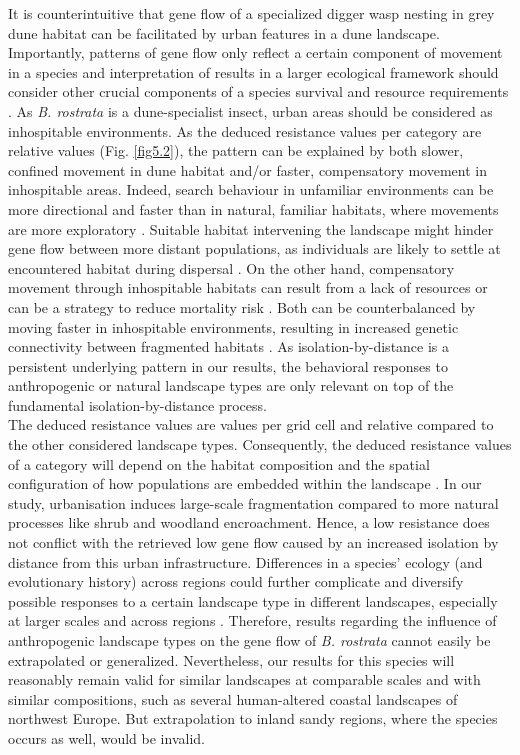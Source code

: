 \documentclass[10pt, twoside]{book} %
\begin{document}
	It is counterintuitive that gene flow of a specialized digger wasp nesting in grey dune habitat can be facilitated by urban features in a dune landscape. Importantly, patterns of gene flow only reflect a certain component of movement in a species and interpretation of results in a larger ecological framework should consider other crucial components of a species survival and resource requirements \citep{spear2010, cushman2010a}. As \textit{B. rostrata} is a dune-specialist insect, urban areas should be considered as inhospitable environments. As the deduced resistance values per category are relative values (Fig. \ref{fig5.2}), the pattern can be explained by both slower, confined movement in dune habitat and/or faster, compensatory movement in inhospitable areas. Indeed, search behaviour in unfamiliar environments can be more directional and faster than in natural, familiar habitats, where movements are more exploratory \citep{vandyck2005, schtickzelle2006, knowlton2010}. Suitable habitat intervening the landscape might hinder gene flow between more distant populations, as individuals are likely to settle at encountered habitat during dispersal \citep{adriaensen2003, mcrae2008, keller2012}. On the other hand, compensatory movement through inhospitable habitats can result from a lack of resources or can be a strategy to reduce mortality risk \citep{schtickzelle2006, peterman2014}. Both can be counterbalanced by moving faster in inhospitable environments, resulting in increased genetic connectivity between fragmented habitats \citep{schtickzelle2006}. As isolation-by-distance is a persistent underlying pattern in our results, the behavioral responses to anthropogenic or natural landscape types are only relevant on top of the fundamental isolation-by-distance process.\\
	
	The deduced resistance values are values per grid cell and relative compared to the other considered landscape types. Consequently, the deduced resistance values of a category will depend on the habitat composition and the spatial configuration of how populations are embedded within the landscape \citep{richardson2016, haran2017}. In our study, urbanisation induces large-scale fragmentation compared to more natural processes like shrub and woodland encroachment. Hence, a low resistance does not conflict with the retrieved low gene flow caused by an increased isolation by distance from this urban infrastructure. Differences in a species' ecology (and evolutionary history) across regions could further complicate and diversify possible responses to a certain landscape type in different landscapes, especially at larger scales and across regions \citep{segelbacher2010, spear2010}. Therefore, results regarding the influence of anthropogenic landscape types on the gene flow of \textit{B. rostrata} cannot easily be extrapolated or generalized. Nevertheless, our results for this species will reasonably remain valid for similar landscapes at comparable scales and with similar compositions, such as several human-altered coastal landscapes of northwest Europe. But extrapolation to inland sandy regions, where the species occurs as well, would be invalid.\\
	
\end{document}
